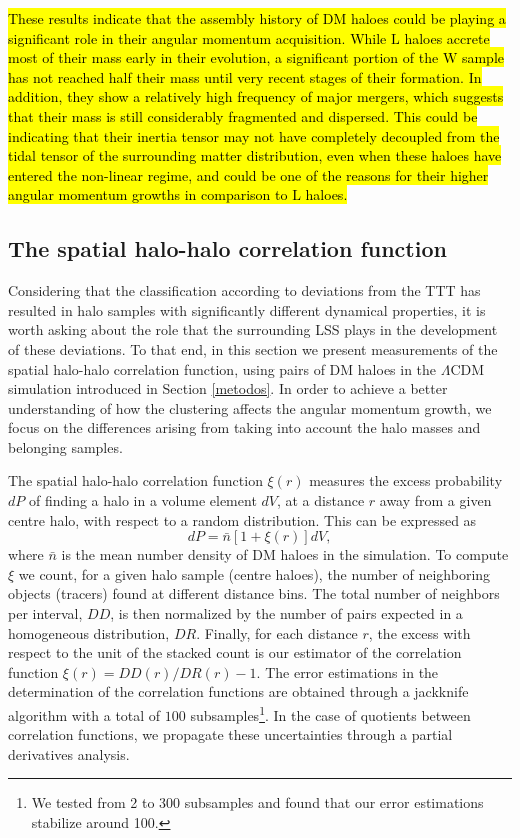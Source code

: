 \documentclass[fleqn,usenatbib]{mnras}
\newcommand{\Wh}{\mathrm{W}}
\newcommand{\Lh}{\mathrm{L}}
\begin{document}
\hl{These results indicate that the assembly history of DM haloes could be playing a significant role in their angular momentum acquisition. While $\Lh$ haloes accrete most of their mass early in their evolution, a significant portion of the $\Wh$ sample has not reached half their mass until very recent stages of their formation. In addition, they show a relatively high frequency of major mergers, which suggests that their mass is still considerably fragmented and dispersed. This could be indicating that their inertia tensor may not have completely decoupled from the tidal tensor of the surrounding matter distribution, even when these haloes have entered the non-linear regime, and could be one of the reasons for their higher angular momentum growths in comparison to $\Lh$ haloes.}

\subsection{The spatial halo-halo correlation function}

Considering that the classification according to deviations from the TTT has resulted in halo samples with significantly different dynamical properties, it is worth asking about the role that the surrounding LSS plays in the development of these deviations. To that end, in this section we present measurements of the spatial halo-halo correlation function, using pairs of DM haloes in the $\Lambda$CDM simulation introduced in Section \ref{metodos}. In order to achieve a better understanding of how the clustering affects the angular momentum growth, we focus on the differences arising from taking into account the halo masses and belonging samples.

The spatial halo-halo correlation function $\xi(r)$ measures the excess probability $dP$ of finding a halo in a volume element $dV$, at a distance $r$ away from a given centre halo, with respect to a random distribution. This can be expressed as
\begin{equation*}
dP=\bar{n}[1+\xi(r)]dV,
\end{equation*}
where $\bar{n}$ is the mean number density of DM haloes in the simulation. To compute $\xi$ we count, for a given halo sample (centre haloes), the number of neighboring objects (tracers) found at different distance bins. The total number of neighbors per interval, $DD$, is then normalized by the number of pairs expected in a homogeneous distribution, $DR$. Finally, for each distance $r$, the excess with respect to the unit of the stacked count is our estimator of the correlation function $\xi(r)=DD(r)/DR(r)-1$. The error estimations in the determination of the correlation functions are obtained through a jackknife algorithm with a total of $100$ subsamples\footnote{We tested from 2 to 300 subsamples and found that our error estimations stabilize around 100.}. In the case of quotients between correlation functions, we propagate these uncertainties through a partial derivatives analysis.
\end{document}
